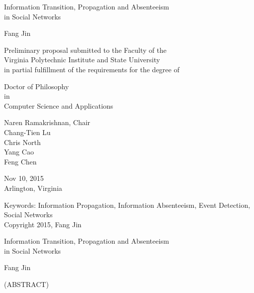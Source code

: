 \documentclass[12pt,dvips]{report}
\begin{document}
\thispagestyle{empty}
\begin{center}

{\Large
Information Transition, Propagation and Absenteeism \\ in Social Networks
}


\vfill

Fang Jin

\vfill

Preliminary proposal submitted to the Faculty of the \\
Virginia Polytechnic Institute and State University \\
in partial fulfillment of the requirements for the degree of

\vfill

Doctor of Philosophy \\
in \\
Computer Science and Applications

\vfill

Naren Ramakrishnan, Chair \\
Chang-Tien Lu \\
Chris North \\
Yang Cao \\
Feng Chen

\vfill

Nov 10, 2015 \\
Arlington, Virginia

\vfill

Keywords: Information Propagation, Information Absenteeism, Event Detection, Social Networks
\\
Copyright 2015, Fang Jin

\end{center}

\pagebreak

\thispagestyle{empty}
\begin{center}

{\large
Information Transition, Propagation and Absenteeism\\ in Social Networks
}

\vfill

Fang Jin

\vfill

(ABSTRACT)
\vfill

\end{center}
\end{document}
